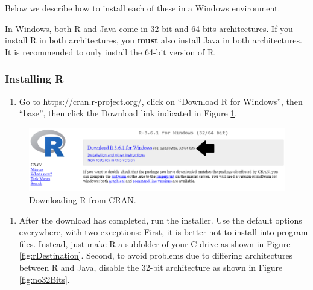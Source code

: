 \documentclass[11pt]{book}
\providecommand{\tightlist}{%
  \setlength{\itemsep}{0pt}\setlength{\parskip}{0pt}}
\theoremstyle{definition}
\theoremstyle{definition}
\theoremstyle{definition}
\theoremstyle{remark}
\let\BeginKnitrBlock\begin \let\EndKnitrBlock\end
\begin{document}
Below we describe how to install each of these in a Windows environment.

\BeginKnitrBlock{rmdimportant}
In Windows, both R and Java come in 32-bit and 64-bits architectures. If
you install R in both architectures, you \textbf{must} also install Java
in both architectures. It is recommended to only install the 64-bit
version of R.
\EndKnitrBlock{rmdimportant}

\subsubsection*{Installing R}\label{installing-r}

\begin{enumerate}
\def\labelenumi{\arabic{enumi}.}
\tightlist
\item
  Go to \url{https://cran.r-project.org/}, click on ``Download R for
  Windows'', then ``base'', then click the Download link indicated in
  Figure \ref{fig:downloadR}.
\end{enumerate}

\begin{figure}

{\centering \includegraphics[width=1\linewidth]{images/OhdsiAnalyticsTools/downloadR} 

}

\caption{Downloading R from CRAN.}\label{fig:downloadR}
\end{figure}

\begin{enumerate}
\def\labelenumi{\arabic{enumi}.}
\setcounter{enumi}{1}
\tightlist
\item
  After the download has completed, run the installer. Use the default
  options everywhere, with two exceptions: First, it is better not to
  install into program files. Instead, just make R a subfolder of your C
  drive as shown in Figure \ref{fig:rDestination}. Second, to avoid
  problems due to differing architectures between R and Java, disable
  the 32-bit architecture as shown in Figure \ref{fig:no32Bits}.
\end{enumerate}
\end{document}
